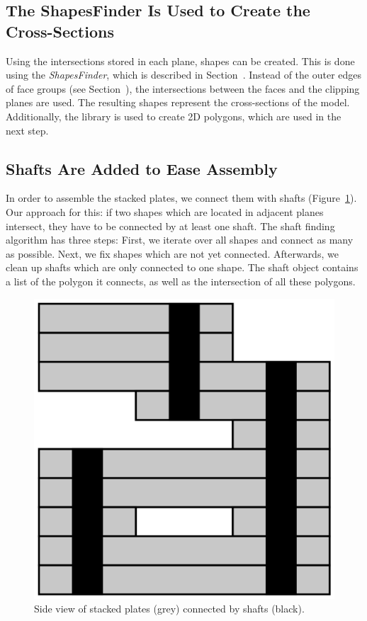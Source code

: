 \documentclass[../ClassicThesis.tex]{subfiles}
\begin{document}
\subsection{The ShapesFinder Is Used to Create the Cross-Sections}

Using the intersections stored in each plane, shapes can be created. This is done using the \emph{ShapesFinder}, which is described in Section~. Instead of the outer edges of face groups (see Section~), the intersections between the faces and the clipping planes are used. The resulting shapes represent the cross-sections of the model. Additionally, the \jsclipper{} library is used to create 2D polygons, which are used in the next step.

\subsection{Shafts Are Added to Ease Assembly}

In order to assemble the stacked plates, we connect them with shafts (Figure~\ref{fig:shafts}). Our approach for this: if two shapes which are located in adjacent planes intersect, they have to be connected by at least one shaft. The shaft finding algorithm has three steps: First, we iterate over all shapes and connect as many as possible. Next, we fix shapes which are not yet connected. Afterwards, we clean up shafts which are only connected to one shape. The shaft object contains a list of the polygon it connects, as well as the intersection of all these polygons.

\begin{figure}
    \centering
    \includegraphics[width=0.5\columnwidth]{Images/plates_shafts.png}
    \caption{Side view of stacked plates (grey) connected by shafts (black).}
    \label{fig:shafts}
\end{figure}
\end{document}
